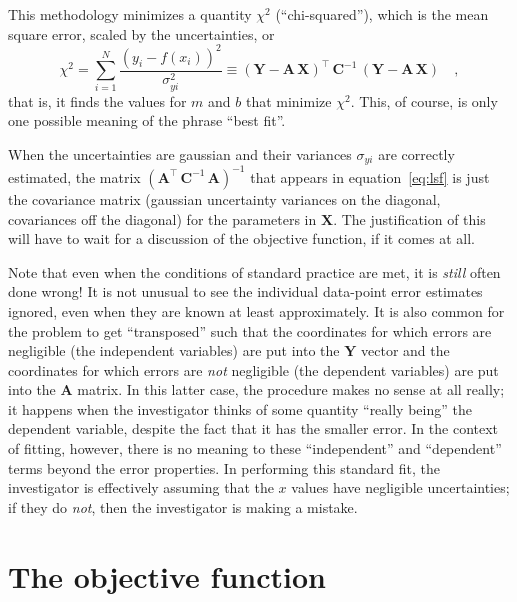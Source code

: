 \documentclass[12pt]{article}
\newcommand{\mmatrix}[1]{\boldsymbol{#1}}
\newcommand{\inverse}[1]{{#1}^{-1}}
\newcommand{\transpose}[1]{{#1}^{\scriptscriptstyle \top}}
\newcommand{\mA}{\mmatrix{A}}
\newcommand{\mAT}{\transpose{\mA}}
\newcommand{\mC}{\mmatrix{C}}
\newcommand{\mCinv}{\inverse{\mC}}
\newcommand{\mX}{\mmatrix{X}}
\newcommand{\mY}{\mmatrix{Y}}
\begin{document}
This methodology minimizes a quantity $\chi^2$ (``chi-squared''),
which is the mean square error, scaled by the uncertainties, or
\begin{equation}
\chi^2
 = \sum_{i=1}^N \frac{\left(y_i - f(x_i)\right)^2}{\sigma_{yi}^2}
 \equiv \transpose{\left(\mY-\mA\,\mX\right)}\,\mCinv\,\left(\mY-\mA\,\mX\right)
 \quad ,
\end{equation}
that is, it finds the values for $m$ and $b$ that minimize $\chi^2$.
This, of course, is only one possible meaning of the phrase ``best
fit''.

When the uncertainties are gaussian and their variances $\sigma_{yi}$
are correctly estimated, the matrix
$\inverse{\left(\mAT\,\mCinv\,\mA\right)}$ that appears in
equation~\ref{eq:lsf} is just the covariance matrix (gaussian
uncertainty variances on the diagonal, covariances off the diagonal)
for the parameters in $\mX$.  The justification of this will have to
wait for a discussion of the objective function, if it comes at all.

Note that even when the conditions of standard practice are met, it is
\emph{still} often done wrong!  It is not unusual to see the
individual data-point error estimates ignored, even when they are
known at least approximately.  It is also common for the problem to
get ``transposed'' such that the coordinates for which errors are
negligible (the independent variables) are put into the $\mY$ vector
and the coordinates for which errors are \emph{not} negligible (the
dependent variables) are put into the $\mA$ matrix.  In this latter
case, the procedure makes no sense at all really; it happens when the
investigator thinks of some quantity ``really being'' the dependent
variable, despite the fact that it has the smaller error.  In the
context of fitting, however, there is no meaning to these
``independent'' and ``dependent'' terms beyond the error properties.
In performing this standard fit, the investigator is effectively
assuming that the $x$ values have negligible uncertainties; if they do
\emph{not}, then the investigator is making a mistake.

\section{The objective function}
\end{document}
